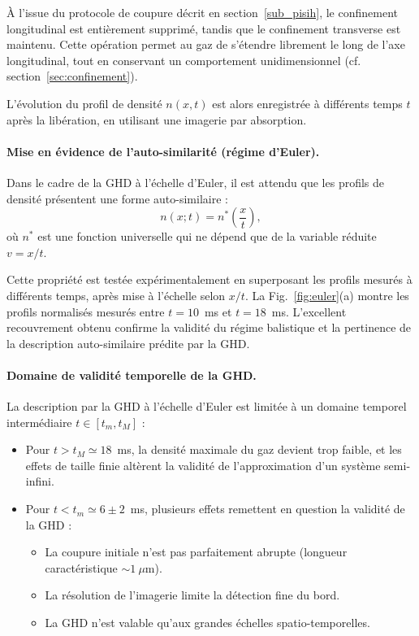 À l’issue du protocole de coupure décrit en section~\ref{sub_pisih}, le confinement longitudinal est entièrement supprimé, tandis que le confinement transverse est maintenu. Cette opération permet au gaz de s’étendre librement le long de l’axe longitudinal, tout en conservant un comportement unidimensionnel (cf. section~\ref{sec:confinement}).

L’évolution du profil de densité $n(x,t)$ est alors enregistrée à différents temps $t$ après la libération, en utilisant une imagerie par absorption.

\paragraph{Mise en évidence de l’auto-similarité (régime d’Euler).}

Dans le cadre de la GHD à l’échelle d’Euler, il est attendu que les profils de densité présentent une forme auto-similaire :
\begin{equation}
n(x;t) = n^\ast\left( \frac{x}{t} \right),
\end{equation}
où $n^\ast$ est une fonction universelle qui ne dépend que de la variable réduite $v = x/t$.

Cette propriété est testée expérimentalement en superposant les profils mesurés à différents temps, après mise à l’échelle selon $x/t$. La Fig.~\ref{fig:euler}(a) montre les profils normalisés mesurés entre $t = 10$~ms et $t = 18$~ms. L’excellent recouvrement obtenu confirme la validité du régime balistique et la pertinence de la description auto-similaire prédite par la GHD.

\paragraph{Domaine de validité temporelle de la GHD.}

La description par la GHD à l’échelle d’Euler est limitée à un domaine temporel intermédiaire $t \in [t_m, t_M]$ :

\begin{itemize}
  \item Pour $t > t_M \simeq 18$~ms, la densité maximale du gaz devient trop faible, et les effets de taille finie altèrent la validité de l’approximation d’un système semi-infini.
  \item Pour $t < t_m \simeq 6 \pm 2$~ms, plusieurs effets remettent en question la validité de la GHD :
  \begin{itemize}
    \item La coupure initiale n’est pas parfaitement abrupte (longueur caractéristique $\sim 1~\mu$m).
    \item La résolution de l’imagerie limite la détection fine du bord.
    \item La GHD n’est valable qu’aux grandes échelles spatio-temporelles.
  \end{itemize}
\end{itemize}

